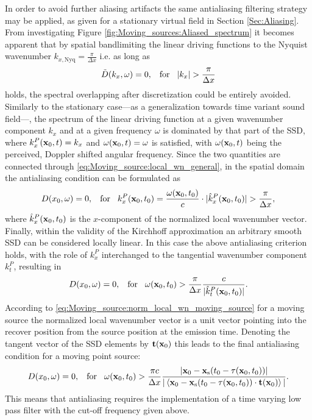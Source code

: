 In order to avoid further aliasing artifacts the same antialiasing filtering strategy may be applied, as given for a stationary virtual field in Section \ref{Sec:Aliasing}.
From investigating Figure \ref{fig:Moving_sources:Aliased_spectrum} it becomes apparent that by spatial bandlimiting the linear driving functions to the Nyquist wavenumber $k_{x,\mathrm{Nyq}} = \frac{\pi}{\Delta x}$ i.e. as long as 
\begin{equation}
\tilde{D}(k_x,\omega) = 0, \hspace{3mm} \text{for} \hspace{3mm}  |k_x| > \frac{\pi}{\Delta x}
\end{equation}
holds, the spectral overlapping after discretization could be entirely avoided.
Similarly to the stationary case---as a generalization towards time variant sound field---, the spectrum of the linear driving function at a given wavenumber component $k_x$ and at a given frequency $\omega$ is dominated by that part of the SSD, where $k_x^P(\mathbf{x}_0,t) = k_x$ and $\omega(\mathbf{x}_0,t) = \omega$ is satisfied, with $\omega(\mathbf{x}_0,t)$ being the perceived, Doppler shifted angular frequency.
Since the two quantities are connected through \eqref{eq:Moving_source:local_wn_general}, in the spatial domain the antialiasing condition can be formulated as
\begin{equation}
D(x_0,\omega) = 0, \hspace{3mm} \text{for} \hspace{3mm}  k_x^P(\mathbf{x}_0,t_0) = \frac{\omega(\mathbf{x}_0,t_0)}{c} \cdot |\hat{k}_x^P(\mathbf{x}_0,t_0)|  > \frac{\pi}{\Delta x},
\end{equation}
where $\hat{k}_x^P(\mathbf{x}_0,t_0)$ is the $x$-component of the normalized local wavenumber vector.
Finally, within the validity of the Kirchhoff approximation an arbitrary smooth SSD can be considered locally linear.
In this case the above antialiasing criterion holds, with the role of $k_x^P$ interchanged to the tangential wavenumber component $k_t^P$, resulting in 
\begin{equation}
D(x_0,\omega) = 0, \hspace{3mm} \text{for} \hspace{3mm} \omega(\mathbf{x}_0,t_0) > \frac{\pi}{\Delta x} \frac{c}{|\hat{k}_t^P(\mathbf{x}_0,t_0)|}.
\end{equation}
According to \eqref{eq:Moving_source:norm_local_wn_moving_source} for a moving source the normalized local wavenumber vector is a unit vector pointing into the recover position from the source position at the emission time.
Denoting the tangent vector of the SSD elements by $\mathbf{t}(\mathbf{x}_0)$ this leads to the final antialiasing condition for a moving point source:
\begin{equation}
D(x_0,\omega) = 0, \hspace{3mm} \text{for} \hspace{3mm} \omega(\mathbf{x}_0,t_0) > \frac{\pi c}{\Delta x} \frac{|\mathbf{x}_0-\mathbf{x}_{\mathrm{s}}(t_0-\tau(\mathbf{x}_0,t_0))|}
{|\left< \mathbf{x}_0-\mathbf{x}_{\mathrm{s}}(t_0-\tau(\mathbf{x}_0,t_0)) \cdot \mathbf{t}(\mathbf{x}_0) \right>|}.
\label{Eq:Moving_source:Antialiasing_cutoff_freq}
\end{equation}
This means that antialiasing requires the implementation of a time varying low pass filter with the cut-off frequency given above.


